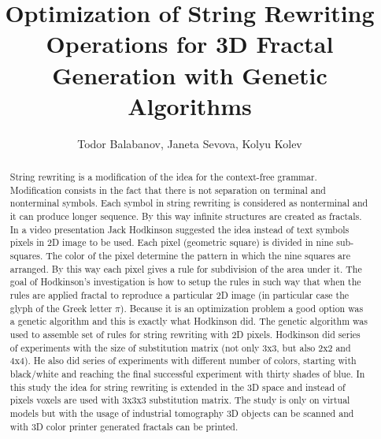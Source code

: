 \documentclass{llncs}
\begin{document}
\title{Optimization of String Rewriting Operations for 3D Fractal Generation with Genetic Algorithms}

\author{Todor Balabanov, Janeta Sevova, Kolyu Kolev}



\maketitle

\begin{abstract}
String rewriting is a modification of the idea for the context-free grammar. Modification consists in the fact that there is not separation on terminal and nonterminal symbols. Each symbol in string rewriting is considered as nonterminal and it can produce longer sequence. By this way infinite structures are created as fractals. In a video presentation Jack Hodkinson suggested the idea instead of text symbols pixels in 2D image to be used. Each pixel (geometric square) is divided in nine sub-squares. The color of the pixel determine the pattern in which the nine squares are arranged. By this way each pixel gives a rule for subdivision of the area under it. The goal of Hodkinson's investigation is how to setup the rules in such way that when the rules are applied fractal to reproduce a particular 2D image (in particular case the glyph of the Greek letter $\pi$). Because it is an optimization problem a good option was a genetic algorithm and this is exactly what Hodkinson did. The genetic algorithm was used to assemble set of rules for string rewriting with 2D pixels. Hodkinson did series of experiments with the size of substitution matrix (not only 3x3, but also 2x2 and 4x4). He also did series of experiments with different number of colors, starting with black/white and reaching the final successful experiment with thirty shades of blue. In this study the idea for string rewriting is extended in the 3D space and instead of pixels voxels are used with 3x3x3 substitution matrix. The study is only on virtual models but with the usage of industrial tomography 3D objects can be scanned and with 3D color printer generated fractals can be printed.

\end{abstract}
\end{document}
